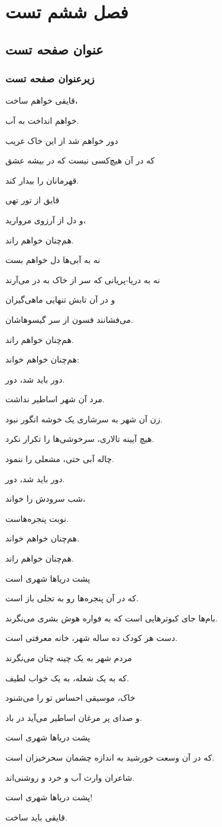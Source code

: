 \chapter{فصل ششم تست}
\section{عنوان صفحه تست}
\subsection{زیرعنوان صفحه تست}
قایقی خواهم ساخت،

خواهم انداخت به آب.

دور خواهم شد از این خاک غریب

که در آن هیچ‌کسی نیست که در بیشه عشق

قهرمانان را بیدار کند.

قایق از تور تهی

و دل از آرزوی مروارید،

هم‌چنان خواهم راند.

نه به آبی‌ها دل خواهم بست

نه به دریا-پریانی که سر از خاک به در می‌آرند

و در آن تابش تنهایی ماهی‌گیران

می‌فشانند فسون از سر گیسوهاشان.

هم‌چنان خواهم راند.

هم‌چنان خواهم خواند:

دور باید شد، دور.

مرد آن شهر اساطیر نداشت.

زن آن شهر به سرشاری یک خوشه انگور نبود.

هیچ آیینه تالاری، سرخوشی‌ها را تکرار نکرد.

چاله آبی حتی، مشعلی را ننمود.

دور باید شد، دور.

شب سرودش را خواند،

نوبت پنجره‌هاست.

هم‌چنان خواهم خواند.

هم‌چنان خواهم راند.

پشت دریاها شهری است

که در آن پنجره‌ها رو به تجلی باز است.

بام‌ها جای کبوترهایی است که به فواره هوش بشری می‌نگرند.

دست هر کودک ده ساله شهر، خانه معرفتی است.

مردم شهر به یک چینه چنان می‌نگرند

که به یک شعله، به یک خواب لطیف.

خاک، موسیقی احساس تو را می‌شنود

و صدای پر مرغان اساطیر می‌آید در باد.

پشت دریاها شهری است

که در آن وسعت خورشید به اندازه چشمان سحرخیزان است.

شاعران وارث آب و خرد و روشنی‌اند.

پشت دریاها شهری است!

قایقی باید ساخت. \cite{qiu2020intelligent}

